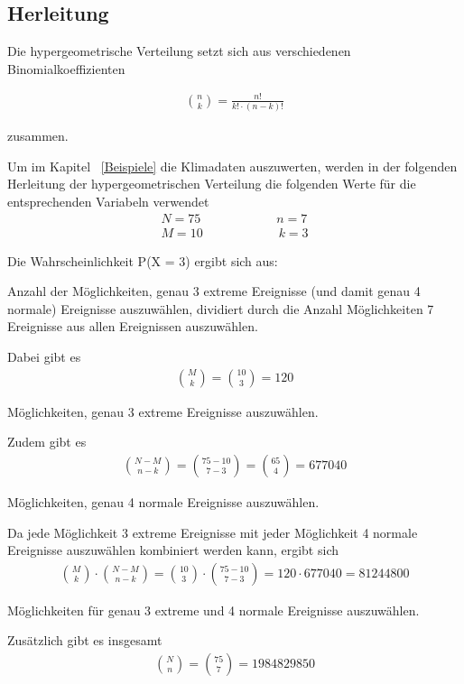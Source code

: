 \begin{refsection}
\subsection{Herleitung}
Die hypergeometrische Verteilung setzt sich aus verschiedenen Binomialkoeffizienten

\begin{align*}
\binom{n}{k} = \frac {n!}{k! \cdot (n-k)!} 
\end{align*}

zusammen.

Um im Kapitel ~\ref{Beispiele}  die Klimadaten auszuwerten, werden in der folgenden Herleitung der hypergeometrischen Verteilung die folgenden Werte für die entsprechenden Variabeln verwendet
\begin{align*}
N = 75 \quad \quad \quad \quad \quad \quad 
n = 7 \\
M = 10 \quad \quad \quad \quad \quad \quad 
k = 3
\end{align*}

Die Wahrscheinlichkeit P(X = 3) ergibt sich aus:

Anzahl der Möglichkeiten, genau 3 extreme Ereignisse (und damit genau 4 normale) Ereignisse auszuwählen, dividiert durch die Anzahl Möglichkeiten 7 Ereignisse aus allen Ereignissen auszuwählen.
 
Dabei gibt es
\begin{align*}
\binom{M}{k} = \binom{10}{3} = 120
\end{align*}

Möglichkeiten, genau 3 extreme Ereignisse auszuwählen.

Zudem gibt es 
\begin{align*}
\binom{N-M}{n-k} = \binom{75-10}{7-3} = \binom{65}{4} = 677040
\end{align*}

Möglichkeiten, genau 4 normale Ereignisse auszuwählen.

Da jede Möglichkeit 3 extreme Ereignisse mit jeder Möglichkeit 4 normale Ereignisse auszuwählen kombiniert werden kann, ergibt sich
\begin{align*}
\binom{M}{k} \cdot \binom{N-M}{n-k} = \binom{10}{3} \cdot \binom{75-10}{7-3} = 120 
\cdot 677040 = 81244800
\end{align*}

Möglichkeiten für genau 3 extreme und 4 normale Ereignisse auszuwählen.


Zusätzlich gibt es insgesamt
\begin{align*}
\binom{N}{n} = \binom{75}{7} = 1984829850
\end{align*}


\end{refsection}
